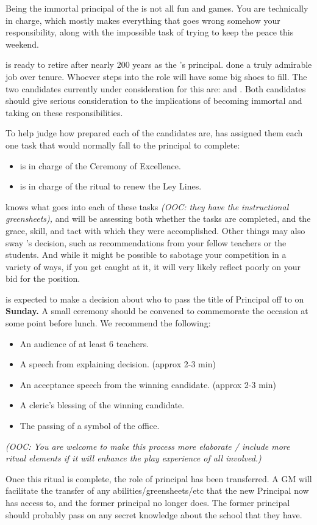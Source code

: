 \documentclass[green]{GL2020}
\begin{document}
\name{\gAssassinateWarlord{}}

Being the immortal principal of the \pSchool{} is not all fun and games. You are technically in charge, which mostly makes everything that goes wrong somehow your responsibility, along with the impossible task of trying to keep the peace this weekend.

\cPrincipal{\full} is ready to retire after nearly 200 years as the \pSc{}’s principal. \cPrincipal{\They}  done a truly admirable job over \cPrincipal{\their} tenure. Whoever steps into the role will have some big shoes to fill. The two candidates currently under consideration for this are: \cMusic{\full} and \cBeetle{\full}. Both candidates should give serious consideration to the implications of becoming immortal and taking on these responsibilities.

To help judge how prepared each of the candidates are, \cPrincipal{} has assigned them each one task that would normally fall to the principal to complete:
\begin{itemize}
  \item \cMusic{} is in charge of the Ceremony of Excellence.
  \item \cBeetle{} is in charge of the ritual to renew the Ley Lines.
\end{itemize}

\cPrincipal{} knows what goes into each of these tasks \emph{(OOC: they have the instructional greensheets),} and will be assessing both whether the tasks are completed, and the grace, skill, and tact with which they were accomplished. Other things may also sway \cPrincipal{}’s decision, such as recommendations from your fellow teachers or the students. And while it might be possible to sabotage your competition in a variety of ways, if you get caught at it, it will very likely reflect poorly on your bid for the position.

\cPrincipal{} is expected to make a decision about who to pass the title of Principal off to on \textbf{Sunday.} A small ceremony should be convened to commemorate the occasion at some point before lunch. We recommend the following:
\begin{itemize}
  \item An audience of at least 6 teachers.
  \item A speech from \cPrincipal{} explaining \cPrincipal{\their} decision. (approx 2-3 min)
  \item An acceptance speech from the winning candidate. (approx 2-3 min)
  \item A cleric’s blessing of the winning candidate.
  \item The passing of a symbol of the office.
\end{itemize}

\emph{(OOC: You are welcome to make this process more elaborate / include more ritual elements if it will enhance the play experience of all involved.)}

Once this ritual is complete, the role of principal has been transferred. A GM will facilitate the transfer of any abilities/greensheets/etc that the new Principal now has access to, and the former principal no longer does. The former principal should probably pass on any secret knowledge about the school that they have.
\end{document}
